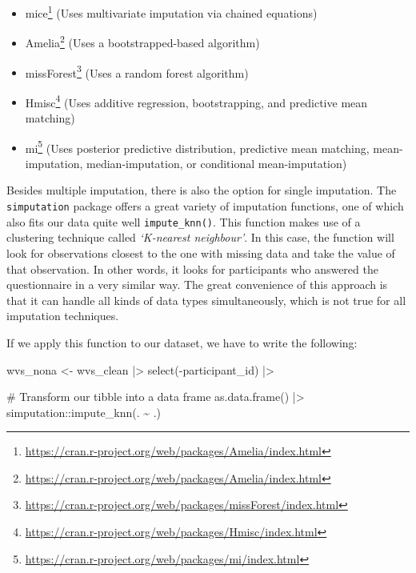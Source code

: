 \documentclass[
  letterpaper,
]{krantz}
\makeatletter
\newenvironment{Shaded}{\begin{snugshade}}{\end{snugshade}}
\newcommand{\CommentTok}[1]{\textcolor[rgb]{0.37,0.37,0.37}{#1}}
\newcommand{\FunctionTok}[1]{\textcolor[rgb]{0.28,0.35,0.67}{#1}}
\newcommand{\NormalTok}[1]{\textcolor[rgb]{0.00,0.23,0.31}{#1}}
\newcommand{\OtherTok}[1]{\textcolor[rgb]{0.00,0.23,0.31}{#1}}
\newcommand{\SpecialCharTok}[1]{\textcolor[rgb]{0.37,0.37,0.37}{#1}}
\renewcommand{\href}[2]{#2\footnote{\url{#1}}}
\newenvironment{kframe}{%
\medskip{}
\setlength{\fboxsep}{.8em}
 \def\at@end@of@kframe{}%
 \ifinner\ifhmode%
  \def\at@end@of@kframe{\end{minipage}}%
  \begin{minipage}{\columnwidth}%
 \fi\fi%
 \def\FrameCommand##1{\hskip\@totalleftmargin \hskip-\fboxsep
 \colorbox{shadecolor}{##1}\hskip-\fboxsep
     \hskip-\linewidth \hskip-\@totalleftmargin \hskip\columnwidth}%
 \MakeFramed {\advance\hsize-\width
   \@totalleftmargin\z@ \linewidth\hsize
   \@setminipage}}%
 {\par\unskip\endMakeFramed%
 \at@end@of@kframe}
\renewenvironment{Shaded}{\begin{kframe}}{\end{kframe}}
\makeatother
\begin{document}
\begin{itemize}
\item
  \href{https://cran.r-project.org/web/packages/Amelia/index.html}{mice}
  (Uses multivariate imputation via chained equations)
\item
  \href{https://cran.r-project.org/web/packages/Amelia/index.html}{Amelia}
  (Uses a bootstrapped-based algorithm)
\item
  \href{https://cran.r-project.org/web/packages/missForest/index.html}{missForest}
  (Uses a random forest algorithm)
\item
  \href{https://cran.r-project.org/web/packages/Hmisc/index.html}{Hmisc}
  (Uses additive regression, bootstrapping, and predictive mean
  matching)
\item
  \href{https://cran.r-project.org/web/packages/mi/index.html}{mi} (Uses
  posterior predictive distribution, predictive mean matching,
  mean-imputation, median-imputation, or conditional mean-imputation)
\end{itemize}

Besides multiple imputation, there is also the option for single
imputation. The \texttt{simputation} package offers a great variety of
imputation functions, one of which also fits our data quite well
\texttt{impute\_knn()}. This function makes use of a clustering
technique called \emph{`K-nearest neighbour'}. In this case, the
function will look for observations closest to the one with missing data
and take the value of that observation. In other words, it looks for
participants who answered the questionnaire in a very similar way. The
great convenience of this approach is that it can handle all kinds of
data types simultaneously, which is not true for all imputation
techniques.

If we apply this function to our dataset, we have to write the
following:

\begin{Shaded}
\begin{Highlighting}[]
\NormalTok{wvs\_nona }\OtherTok{\textless{}{-}}
\NormalTok{  wvs\_clean }\SpecialCharTok{|\textgreater{}}
  \FunctionTok{select}\NormalTok{(}\SpecialCharTok{{-}}\NormalTok{participant\_id) }\SpecialCharTok{|\textgreater{}}
  
  \CommentTok{\# Transform our tibble into a data frame}
  \FunctionTok{as.data.frame}\NormalTok{() }\SpecialCharTok{|\textgreater{}}
\NormalTok{  simputation}\SpecialCharTok{::}\FunctionTok{impute\_knn}\NormalTok{(. }\SpecialCharTok{\textasciitilde{}}\NormalTok{ .)}
\end{Highlighting}
\end{Shaded}
\end{document}
